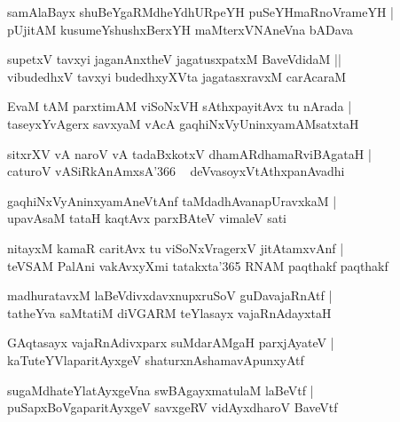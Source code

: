 \documentclass[twoside,12pt,openright]{book}
\newcounter{shloka}[chapter]
\begin{document}
\begin{shloka}%
samAlaBayx shuBeYgaRMdheYdhURpeYH puSeYHmaRnoVrameYH |\\
pUjitAM kusumeYshushxBerxYH maMterxVNAneVna bADava
\end{shloka}

\begin{shloka}%
supetxV tavxyi jaganAnxtheV jagatusxpatxM BaveVdidaM ||\\
vibudedhxV tavxyi budedhxyXVta jagatasxravxM carAcaraM 
\end{shloka}

\begin{shloka}%
EvaM tAM parxtimAM viSoNxVH sAthxpayitAvx tu nArada |\\
taseyxYvAgerx savxyaM vAcA gaqhiNxVyUninxyamAMsatxtaH 
\end{shloka}

\begin{shloka}%
sitxrXV vA naroV vA tadaBxkotxV dhamARdhamaRviBAgataH |\\
caturoV vASiRkAnAmxsA\char'366 ~ deVvasoyxVtAthxpanAvadhi
\end{shloka}

\begin{shloka}%
gaqhiNxVyAninxyamAneVtAnf taMdadhAvanapUravxkaM |\\
upavAsaM tataH kaqtAvx parxBAteV vimaleV sati
\end{shloka}

\begin{shloka}%
nitayxM kamaR caritAvx tu viSoNxVragerxV jitAtamxvAnf |\\
teVSAM PalAni vakAvxyXmi tatakxta\char'365 RNAM paqthakf paqthakf
\end{shloka}

\begin{shloka}%
madhuratavxM laBeVdivxdavxnupxruSoV guDavajaRnAtf |\\
tatheYva saMtatiM diVGARM teYlasayx vajaRnAdayxtaH 
\end{shloka}

\begin{shloka}%
GAqtasayx vajaRnAdivxparx suMdarAMgaH parxjAyateV |\\
kaTuteYVlaparitAyxgeV shaturxnAshamavApunxyAtf
\end{shloka}

\begin{shloka}%
sugaMdhateYlatAyxgeVna swBAgayxmatulaM laBeVtf |\\
puSapxBoVgaparitAyxgeV savxgeRV vidAyxdharoV BaveVtf 
\end{shloka}
\end{document}

